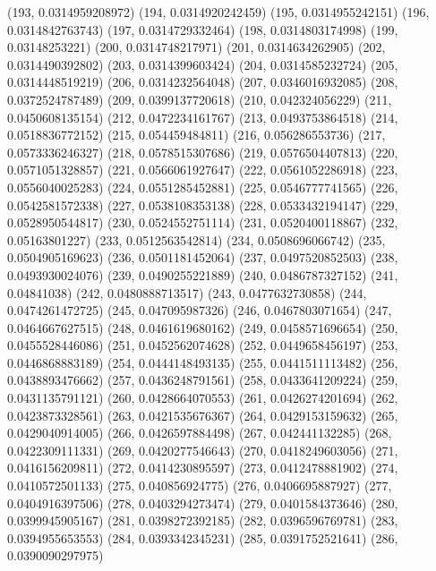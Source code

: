 {					(193, 0.0314959208972)
					(194, 0.0314920242459)
					(195, 0.0314955242151)
					(196, 0.0314842763743)
					(197, 0.0314729332464)
					(198, 0.0314803174998)
					(199, 0.03148253221)
					(200, 0.0314748217971)
					(201, 0.0314634262905)
					(202, 0.0314490392802)
					(203, 0.0314399603424)
					(204, 0.0314585232724)
					(205, 0.0314448519219)
					(206, 0.0314232564048)
					(207, 0.0346016932085)
					(208, 0.0372524787489)
					(209, 0.0399137720618)
					(210, 0.042324056229)
					(211, 0.0450608135154)
					(212, 0.0472234161767)
					(213, 0.0493753864518)
					(214, 0.0518836772152)
					(215, 0.054459484811)
					(216, 0.056286553736)
					(217, 0.0573336246327)
					(218, 0.0578515307686)
					(219, 0.0576504407813)
					(220, 0.0571051328857)
					(221, 0.0566061927647)
					(222, 0.0561052286918)
					(223, 0.0556040025283)
					(224, 0.0551285452881)
					(225, 0.0546777741565)
					(226, 0.0542581572338)
					(227, 0.0538108353138)
					(228, 0.0533432194147)
					(229, 0.0528950544817)
					(230, 0.0524552751114)
					(231, 0.0520400118867)
					(232, 0.05163801227)
					(233, 0.0512563542814)
					(234, 0.0508696066742)
					(235, 0.0504905169623)
					(236, 0.0501181452064)
					(237, 0.0497520852503)
					(238, 0.0493930024076)
					(239, 0.0490255221889)
					(240, 0.0486787327152)
					(241, 0.04841038)
					(242, 0.0480888713517)
					(243, 0.0477632730858)
					(244, 0.0474261472725)
					(245, 0.047095987326)
					(246, 0.0467803071654)
					(247, 0.0464667627515)
					(248, 0.0461619680162)
					(249, 0.0458571696654)
					(250, 0.0455528446086)
					(251, 0.0452562074628)
					(252, 0.0449658456197)
					(253, 0.0446868883189)
					(254, 0.0444148493135)
					(255, 0.0441511113482)
					(256, 0.0438893476662)
					(257, 0.0436248791561)
					(258, 0.0433641209224)
					(259, 0.0431135791121)
					(260, 0.0428664070553)
					(261, 0.0426274201694)
					(262, 0.0423873328561)
					(263, 0.0421535676367)
					(264, 0.0429153159632)
					(265, 0.0429040914005)
					(266, 0.0426597884498)
					(267, 0.042441132285)
					(268, 0.0422309111331)
					(269, 0.0420277546643)
					(270, 0.0418249603056)
					(271, 0.0416156209811)
					(272, 0.0414230895597)
					(273, 0.0412478881902)
					(274, 0.0410572501133)
					(275, 0.040856924775)
					(276, 0.0406695887927)
					(277, 0.0404916397506)
					(278, 0.0403294273474)
					(279, 0.0401584373646)
					(280, 0.0399945905167)
					(281, 0.0398272392185)
					(282, 0.0396596769781)
					(283, 0.0394955653553)
					(284, 0.0393342345231)
					(285, 0.0391752521641)
					(286, 0.0390090297975)
}
